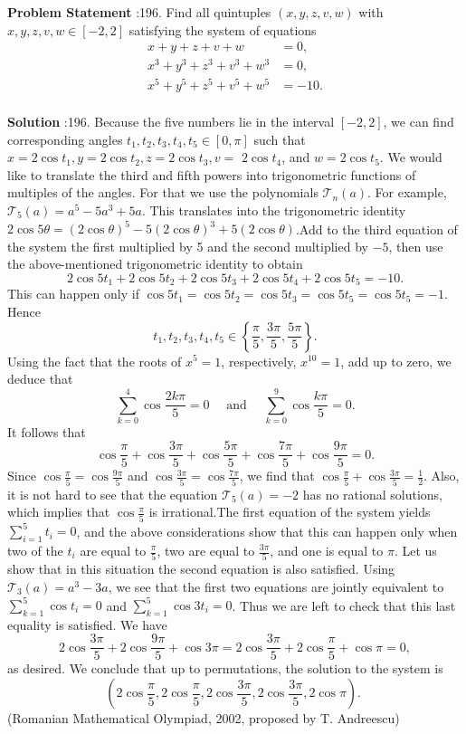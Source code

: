 \documentclass[10pt]{article}
\begin{document}
\textbf{Problem Statement} :196. Find all quintuples $(x, y, z, v, w)$ with $x, y, z, v, w \in[-2,2]$ satisfying the system of equations$$ \begin{aligned} x+y+z+v+w &=0, \\ x^{3}+y^{3}+z^{3}+v^{3}+w^{3} &=0, \\ x^{5}+y^{5}+z^{5}+v^{5}+w^{5} &=-10 . \end{aligned} $$\\
\textbf{Solution} :196. Because the five numbers lie in the interval $[-2,2]$, we can find corresponding angles $t_{1}, t_{2}, t_{3}, t_{4}, t_{5} \in[0, \pi]$ such that $x=2 \cos t_{1}, y=2 \cos t_{2}, z=2 \cos t_{3}, v=$ $2 \cos t_{4}$, and $w=2 \cos t_{5}$. We would like to translate the third and fifth powers into trigonometric functions of multiples of the angles. For that we use the polynomials $\mathcal{T}_{n}(a)$. For example, $\mathcal{T}_{5}(a)=a^{5}-5 a^{3}+5 a$. This translates into the trigonometric identity $2 \cos 5 \theta=(2 \cos \theta)^{5}-5(2 \cos \theta)^{3}+5(2 \cos \theta)$.Add to the third equation of the system the first multiplied by 5 and the second multiplied by $-5$, then use the above-mentioned trigonometric identity to obtain$$ 2 \cos 5 t_{1}+2 \cos 5 t_{2}+2 \cos 5 t_{3}+2 \cos 5 t_{4}+2 \cos 5 t_{5}=-10 . $$This can happen only if $\cos 5 t_{1}=\cos 5 t_{2}=\cos 5 t_{3}=\cos 5 t_{5}=\cos 5 t_{5}=-1$. Hence$$ t_{1}, t_{2}, t_{3}, t_{4}, t_{5} \in\left\{\frac{\pi}{5}, \frac{3 \pi}{5}, \frac{5 \pi}{5}\right\} . $$Using the fact that the roots of $x^{5}=1$, respectively, $x^{10}=1$, add up to zero, we deduce that$$ \sum_{k=0}^{4} \cos \frac{2 k \pi}{5}=0 \quad \text { and } \quad \sum_{k=0}^{9} \cos \frac{k \pi}{5}=0 . $$It follows that$$ \cos \frac{\pi}{5}+\cos \frac{3 \pi}{5}+\cos \frac{5 \pi}{5}+\cos \frac{7 \pi}{5}+\cos \frac{9 \pi}{5}=0 . $$Since $\cos \frac{\pi}{5}=\cos \frac{9 \pi}{5}$ and $\cos \frac{3 \pi}{5}=\cos \frac{7 \pi}{5}$, we find that $\cos \frac{\pi}{5}+\cos \frac{3 \pi}{5}=\frac{1}{2}$. Also, it is not hard to see that the equation $\mathcal{T}_{5}(a)=-2$ has no rational solutions, which implies that $\cos \frac{\pi}{5}$ is irrational.The first equation of the system yields $\sum_{i=1}^{5} t_{i}=0$, and the above considerations show that this can happen only when two of the $t_{i}$ are equal to $\frac{\pi}{5}$, two are equal to $\frac{3 \pi}{5}$, and one is equal to $\pi$. Let us show that in this situation the second equation is also satisfied. Using $\mathcal{T}_{3}(a)=a^{3}-3 a$, we see that the first two equations are jointly equivalent to $\sum_{k=1}^{5} \cos t_{i}=0$ and $\sum_{k=1}^{5} \cos 3 t_{i}=0$. Thus we are left to check that this last equality is satisfied. We have$$ 2 \cos \frac{3 \pi}{5}+2 \cos \frac{9 \pi}{5}+\cos 3 \pi=2 \cos \frac{3 \pi}{5}+2 \cos \frac{\pi}{5}+\cos \pi=0, $$as desired. We conclude that up to permutations, the solution to the system is $$ \left(2 \cos \frac{\pi}{5}, 2 \cos \frac{\pi}{5}, 2 \cos \frac{3 \pi}{5}, 2 \cos \frac{3 \pi}{5}, 2 \cos \pi\right) \text {. } $$(Romanian Mathematical Olympiad, 2002, proposed by T. Andreescu)\\
\end{document}
